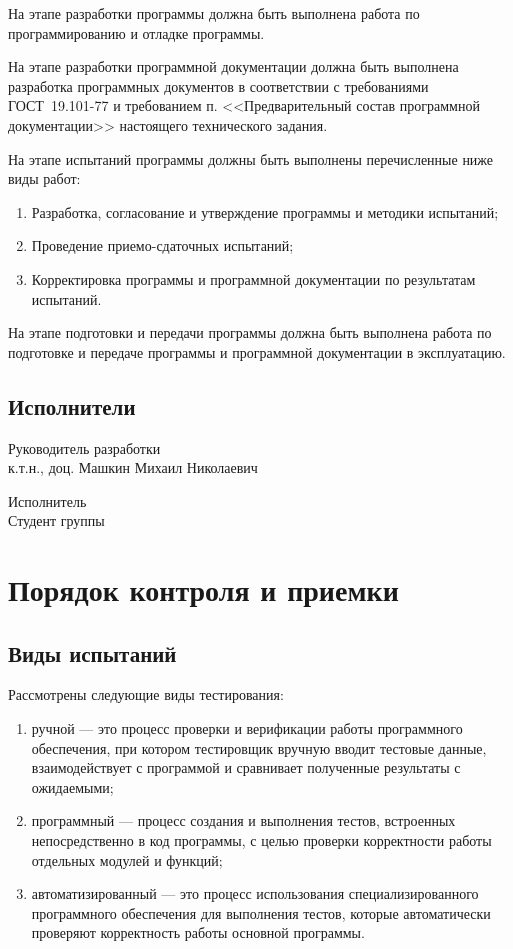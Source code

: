 \documentclass[14pt,a4paper,final]{extreport}
\begin{document}
\pagebreak %


\fancyhead[C]{\bfseries\thepage\\\docstamp}  %

На этапе разработки программы должна быть выполнена работа по программированию и отладке программы.

На этапе разработки программной документации должна быть выполнена разработка программных документов в соответствии с требованиями ГОСТ~19.101-77 и требованием п. <<Предварительный состав программной документации>> настоящего технического задания.

На этапе испытаний программы должны быть выполнены перечисленные ниже виды работ:
\begin{enumerate}[label=\asbuk*),ref=\asbuk*]
	\item Разработка, согласование и утверждение программы и методики испытаний;
	\item Проведение приемо-сдаточных испытаний;
	\item Корректировка программы и программной документации по результатам испытаний.
\end{enumerate}

На этапе подготовки и передачи программы должна быть выполнена работа по подготовке и передаче программы и программной документации в эксплуатацию.

\section{Исполнители}
Руководитель разработки\\
\indent к.т.н., доц. Машкин Михаил Николаевич
\bigskip

Исполнитель\\
\indent Студент группы \grp\ \fullname

\chapter{Порядок контроля и приемки}

\section{Виды испытаний}
Рассмотрены следующие виды тестирования:
\begin{enumerate}[label=\asbuk*),ref=\asbuk*]
	\item ручной --- это процесс проверки и верификации работы программного обеспечения, при котором тестировщик вручную вводит тестовые данные, взаимодействует с программой и сравнивает полученные результаты с ожидаемыми;

	\item программный --- процесс создания и выполнения тестов, встроенных непосредственно в код программы, с целью проверки корректности работы отдельных модулей и функций;

	\item автоматизированный --- это процесс использования специализированного программного обеспечения для выполнения тестов, которые автоматически проверяют корректность работы основной программы.
\end{enumerate}
\end{document}
